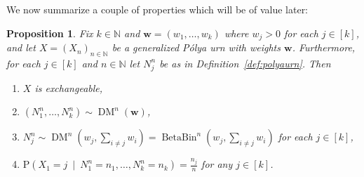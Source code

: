 \documentclass[a4paper, final]{amsart}
\theoremstyle{plain}
\newtheorem{prop}[thm]{Proposition}
\theoremstyle{definition}
\DeclareMathOperator{\dirmult}{DM}
\DeclareMathOperator{\betabin}{BetaBin}
\newcommand{\nin}{{n \in \mathbb{N}}}
\renewcommand{\P}{\mathrm{P}}
\newcommand{\N}{\mathbb{N}}
\begin{document}
%
\noindent
We now summarize a couple of properties which will be of value later:
%
\begin{prop}
  Fix $k \in \N$ and ${\mathbf{w} = (w_1, \ldots, w_k)}$ where $w_j > 0$ for each $j \in [k]$, and let $X = {(X_n)}_\nin$ be a generalized P\'{o}lya urn with weights $\mathbf{w}$.
  Furthermore, for each $j \in [k]$ and $\nin$ let $N_j^n$ be as in Definition~\ref{def:polyaurn}.
  Then
  \begin{enumerate}
    \item $X$ is exchangeable,
    \item $(N_1^n, \ldots, N_k^n) \sim \dirmult^n(\mathbf{w})$,
    \item $N_j^n \sim \dirmult^n \left( w_j, \sum_{i \neq j} w_i \right) = \betabin^n \left( w_j, \sum_{i \neq j} w_i \right)$ for each $j \in [k]$,
    \item\label{prop:polyaurn_conditioning} $\P \left( X_1 = j \ \middle \vert \ N_1^n = n_1, \ldots, N_k^n = n_k \right) = \frac{n_j}{n}$ for any $j \in [k]$.
  \end{enumerate}
  \label{prop:polyaurn}
\end{prop}
%
\end{document}
